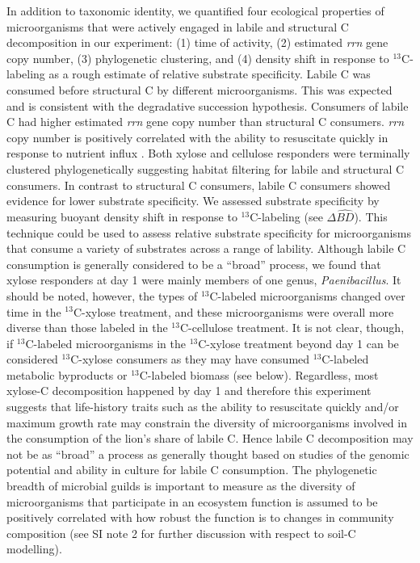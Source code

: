 In addition to taxonomic identity, we quantified four ecological
properties of microorganisms that were actively engaged in labile and
structural C decomposition in our experiment: (1) time of activity, (2) estimated
\textit{rrn} gene copy number, (3) phylogenetic clustering, and (4) density shift
in response to $^{13}$C-labeling as a rough estimate of relative substrate
specificity. Labile C was consumed before structural C by different
microorganisms. This was expected and is consistent with the degradative
succession hypothesis. Consumers of labile C had higher estimated \textit{rrn}
gene copy number than structural C consumers.  \textit{rrn} copy number is
positively correlated with the ability to resuscitate quickly in response to
nutrient influx \citep{Klappenbach_2000}.  Both xylose and cellulose responders
were terminally clustered phylogenetically suggesting habitat filtering for
labile and structural C consumers. In contrast to structural C consumers,
labile C consumers showed evidence for lower substrate specificity. We assessed
substrate specificity by measuring buoyant density shift in response to
$^{13}$C-labeling (see $\Delta\hat{BD}$). This technique could be used to
assess relative substrate specificity for microorganisms that consume a variety
of substrates across a range of lability.  Although labile C consumption is
generally considered to be a ``broad'' process, we found that xylose responders
at day 1 were mainly members of one genus, \textit{Paenibacillus}.  It should
be noted, however, the types of $^{13}$C-labeled microorganisms changed over
time in the $^{13}$C-xylose treatment, and these microorganisms were overall
more diverse than those labeled in the $^{13}$C-cellulose treatment. It is not
clear, though,  if $^{13}$C-labeled microorganisms in the $^{13}$C-xylose
treatment beyond day 1 can be considered $^{13}$C-xylose consumers as they may
have consumed $^{13}$C-labeled metabolic byproducts or $^{13}$C-labeled biomass
(see below).  Regardless, most xylose-C decomposition happened by day 1 and
therefore this experiment suggests that life-history traits such as the ability
to resuscitate quickly and/or maximum growth rate may constrain the diversity
of microorganisms involved in the consumption of the lion's share of labile C.
Hence labile C decomposition may not be as ``broad'' a process as generally
thought based on studies of the genomic potential and ability in culture for
labile C consumption. The phylogenetic breadth of microbial guilds is important
to measure as the diversity of microorganisms that participate in an ecosystem
function is assumed to be positively correlated with how robust the function is
to changes in community composition \citep{Schimel_1995} (see SI note 2 for
further discussion with respect to soil-C modelling).

